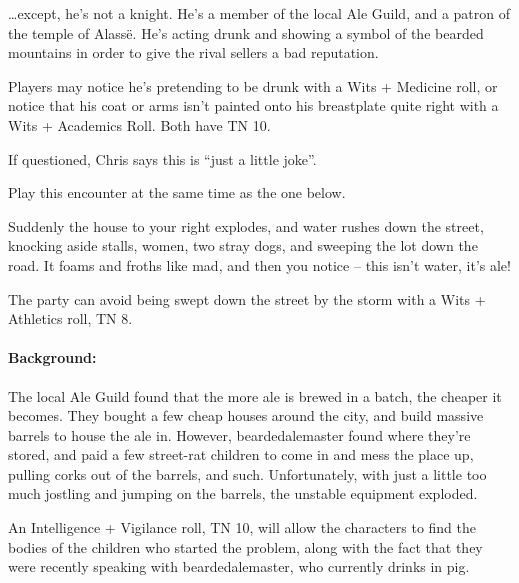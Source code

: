 \begin{multicols}{2}
\begin{boxtext}
\end{boxtext}

\ldots except, he's not a knight.
He's a member of the local Ale Guild, and a patron of the temple of Alass\"{e}.
He's acting drunk and showing a symbol of the bearded mountains in order to give the rival sellers a bad reputation.

Players may notice he's pretending to be drunk with a Wits + Medicine roll, or notice that his coat or arms isn't painted onto his breastplate quite right with a Wits + Academics Roll.  Both have TN 10.



If questioned, Chris says this is ``just a little joke''.


Play this encounter at the same time as the one below.

\begin{boxtext}
	Suddenly the house to your right explodes, and water rushes down the street, knocking aside stalls, women, two stray dogs, and sweeping the lot down the road.  It foams and froths like mad, and then you notice -- this isn't water, it's ale!
\end{boxtext}

The party can avoid being swept down the street by the storm with a Wits + Athletics roll, TN 8.

\paragraph{Background:} The local Ale Guild found that the more ale is brewed in a batch, the cheaper it becomes.
They bought a few cheap houses around the city, and build massive barrels to house the ale in.
However, \gls{beardedalemaster} found where they're stored, and paid a few street-rat children to come in and mess the place up, pulling corks out of the barrels, and such.
Unfortunately, with just a little too much jostling and jumping on the barrels, the unstable equipment exploded.

An Intelligence + Vigilance roll, TN 10, will allow the characters to find the bodies of the children who started the problem, along with the fact that they were recently speaking with \gls{beardedalemaster}, who currently drinks in \gls{pig}.


\end{multicols}
